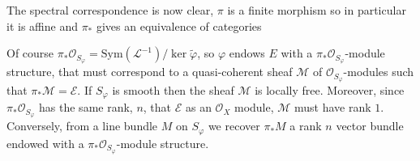 \documentclass[12pt,a4paper]{book}
\theoremstyle{definition} \newtheorem{defn}[thm]{Definition}
\theoremstyle{definition} \newtheorem{ejemplo}[thm]{Example}
\theoremstyle{remark} \newtheorem{rem}[thm]{Remark}
\def\OO{\mathscr{O}}
\def\LL{\mathscr{L}}
\def\MM{\mathscr{M}}
\def\EE{\mathscr{E}}
\def\Sym{\mathrm{Sym}}
\begin{document}
      The spectral correspondence is now clear, $\pi$ is a finite morphism so in particular it is affine and $\pi_*$ gives an equivalence of categories
  \begin{center}
  \end{center}
  Of course $\pi_*\OO_{S_\varphi}=\Sym(\LL^{-1})/\ker \tilde{\varphi}$, so $\varphi$ endows $E$ with a $\pi_*\OO_{S_\varphi}$-module structure, that must correspond to a quasi-coherent sheaf $\MM$ of $\OO_{S_\varphi}$-modules such that $\pi_* \MM=\EE$. If $S_\varphi$ is smooth then the sheaf $\MM$ is locally free. Moreover, since  $\pi_*\OO_{S_\varphi}$ has the same rank, $n$, that $\EE$ as an $\OO_X$ module, $\MM$ must have rank $1$. Conversely, from a line bundle $M$ on $S_\varphi$ we recover $\pi_*M$ a rank $n$ vector bundle endowed with a $\pi_*\OO_{S_\varphi}$-module structure. 
\end{document}
